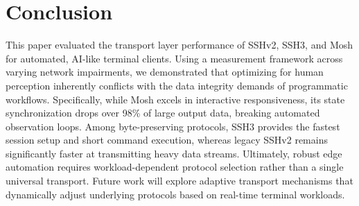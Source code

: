 \section{Conclusion}
\label{sec:conclusion}

This paper evaluated the transport layer performance of SSHv2, SSH3, and Mosh for automated, AI-like terminal clients. Using a measurement framework across varying network impairments, we demonstrated that optimizing for human perception inherently conflicts with the data integrity demands of programmatic workflows. Specifically, while Mosh excels in interactive responsiveness, its state synchronization drops over 98\% of large output data, breaking automated observation loops. Among byte-preserving protocols, SSH3 provides the fastest session setup and short command execution, whereas legacy SSHv2 remains significantly faster at transmitting heavy data streams. Ultimately, robust edge automation requires workload-dependent protocol selection rather than a single universal transport. Future work will explore adaptive transport mechanisms that dynamically adjust underlying protocols based on real-time terminal workloads.